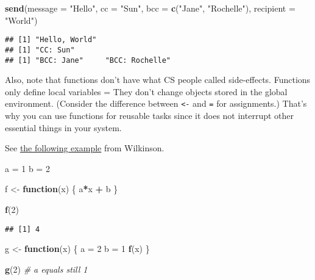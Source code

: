 \documentclass[
]{book}
\newenvironment{Shaded}{\begin{snugshade}}{\end{snugshade}}
\newcommand{\CommentTok}[1]{\textcolor[rgb]{0.56,0.35,0.01}{\textit{#1}}}
\newcommand{\ControlFlowTok}[1]{\textcolor[rgb]{0.13,0.29,0.53}{\textbf{#1}}}
\newcommand{\DataTypeTok}[1]{\textcolor[rgb]{0.13,0.29,0.53}{#1}}
\newcommand{\DecValTok}[1]{\textcolor[rgb]{0.00,0.00,0.81}{#1}}
\newcommand{\KeywordTok}[1]{\textcolor[rgb]{0.13,0.29,0.53}{\textbf{#1}}}
\newcommand{\NormalTok}[1]{#1}
\newcommand{\OperatorTok}[1]{\textcolor[rgb]{0.81,0.36,0.00}{\textbf{#1}}}
\newcommand{\StringTok}[1]{\textcolor[rgb]{0.31,0.60,0.02}{#1}}
\begin{document}
\begin{Shaded}
\begin{Highlighting}[]
\KeywordTok{send}\NormalTok{(}\DataTypeTok{message =} \StringTok{"Hello"}\NormalTok{, }\DataTypeTok{cc =} \StringTok{"Sun"}\NormalTok{, }\DataTypeTok{bcc =} \KeywordTok{c}\NormalTok{(}\StringTok{"Jane"}\NormalTok{, }\StringTok{"Rochelle"}\NormalTok{), }\DataTypeTok{recipient =} \StringTok{"World"}\NormalTok{)}
\end{Highlighting}
\end{Shaded}

\begin{verbatim}
## [1] "Hello, World"
## [1] "CC: Sun"
## [1] "BCC: Jane"     "BCC: Rochelle"
\end{verbatim}

Also, note that functions don't have what CS people called side-effects. Functions only define local variables = They don't change objects stored in the global environment. (Consider the difference between \texttt{\textless{}-} and \texttt{=} for assignments.) That's why you can use functions for reusable tasks since it does not interrupt other essential things in your system.

See \href{https://darrenjw.wordpress.com/2011/11/23/lexical-scope-and-function-closures-in-r/}{the following example} from Wilkinson.

\begin{Shaded}
\begin{Highlighting}[]
\NormalTok{a =}\StringTok{ }\DecValTok{1} 
\NormalTok{b =}\StringTok{ }\DecValTok{2}

\NormalTok{f \textless{}{-}}\StringTok{ }\ControlFlowTok{function}\NormalTok{(x)}
\NormalTok{\{}
\NormalTok{  a}\OperatorTok{*}\NormalTok{x }\OperatorTok{+}\StringTok{ }\NormalTok{b}
\NormalTok{\}}

\KeywordTok{f}\NormalTok{(}\DecValTok{2}\NormalTok{)}
\end{Highlighting}
\end{Shaded}

\begin{verbatim}
## [1] 4
\end{verbatim}

\begin{Shaded}
\begin{Highlighting}[]
\NormalTok{g \textless{}{-}}\StringTok{ }\ControlFlowTok{function}\NormalTok{(x)}
\NormalTok{\{}
\NormalTok{  a =}\StringTok{ }\DecValTok{2}
\NormalTok{  b =}\StringTok{ }\DecValTok{1}
  \KeywordTok{f}\NormalTok{(x)}
\NormalTok{\}}

\KeywordTok{g}\NormalTok{(}\DecValTok{2}\NormalTok{) }\CommentTok{\# a equals still 1 }
\end{Highlighting}
\end{Shaded}
\end{document}
